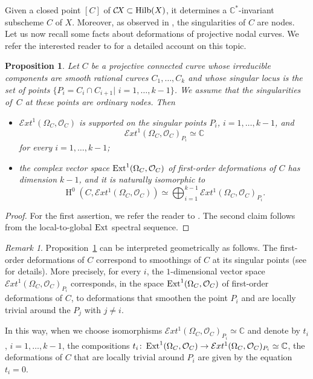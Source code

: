 \documentclass[10pt,a4paper]{article}
\numberwithin{equation}{section}
\newtheorem{proposition}[theorem]{Proposition}
\theoremstyle{definition}
\theoremstyle{remark}
\newtheorem{remark}[theorem]{Remark}
\DeclareMathOperator{\HH}{H}
\def\C{{\mathbb C}}
\def\cO{{\mathcal{O}}}
\def\cExt{{\mathcal E}xt}
\def\operatorname#1{\mathop{\rm #1}\nolimits}
\def\Ext{\operatorname{Ext}}
\def\Hilb{\operatorname{Hilb}}
\def\CX{\mathcal{C}\!X\hspace{-0.5pt}}
\begin{document}
Given a closed point $[C]$ of $\CX\subset \Hilb(X)$, it determines a $\C^*$-invariant subscheme $C$ of $X$. Moreover, as observed in \cite[Proof of Proposition 6.4]{WORS6}, the singularities of $C$ are nodes. Let us now recall some facts about deformations of projective nodal curves. We refer the interested reader to \cite[Section~6]{Talpo} for a detailed account on this topic.

\begin{proposition}\label{prop:deforms}
Let $C$ be a projective connected curve whose irreducible components are smooth rational curves $C_1,\dots, C_k$ and whose singular locus is the set of points $\{P_i=C_{i}\cap C_{i+1}|\,\,i=1,\dots,k-1\}$. We assume that the singularities of\, $C$ at these points are ordinary nodes. Then 
\begin{itemize}[leftmargin=25pt]
\item $\cExt^1(\Omega_C,\cO_C)$ is supported on the singular points $P_i$, $i=1,\dots,k-1$, and $$\cExt^1(\Omega_C,\cO_C)_{P_i}\simeq \C$$
for every $i=1,\dots,k-1$;
\item the complex vector space $\Ext^1(\Omega_C,\cO_C)$ of first-order deformations of $C$  has dimension $k-1$, and it is naturally isomorphic to
\[
\HH^0(C,\cExt^1(\Omega_C,\cO_C))\simeq \bigoplus_{i=1}^{k-1}\cExt^1(\Omega_C,\cO_C)_{P_i}.
\]
\end{itemize}
\end{proposition}

\begin{proof}
For the first assertion, we refer the reader to \cite[Remark~6.4.2]{Talpo}. The second claim follows from the local-to-global
$\Ext$ spectral sequence.
\end{proof}

\begin{remark}\label{rem:deforms}
  Proposition~\ref{prop:deforms} can be interpreted geometrically as follows. The first-order deformations of $C$ correspond to smoothings of $C$ at its singular points (see \cite[Sections~6.3 and~6.4]{Talpo} for details).  More precisely, for every $i$, the $1$-dimensional vector space $\cExt^1(\Omega_C,\cO_C)_{P_i}$ corresponds, in the space $\Ext^1(\Omega_C,\cO_C)$ of first-order deformations of $C$, to deformations that smoothen the point $P_i$ and are locally trivial around the $P_j$ with $j\neq i$.

In this way, when we choose isomorphisms $\cExt^1(\Omega_C,\cO_C)_{P_i}\simeq \C$ and denote by $t_i$, $i=1,\dots , k-1$, the compositions
$t_i\colon\Ext^1(\Omega_C,\cO_C)\to \cExt^1(\Omega_C,\cO_C)_{P_i}\simeq \C$,  the deformations of $C$ that are locally trivial around $P_i$ are given by the equation $t_i=0$.
\end{remark}
\end{document}
